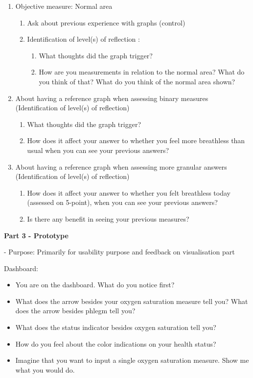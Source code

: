 \begin{enumerate}
\begin{enumerate}
\end{enumerate}
\item Objective measure: Normal area
\begin{enumerate}
	\item Ask about previous experience with graphs (control)
	\item Identification of level(s) of reflection :
	\begin{enumerate}
		\item What thoughts did the graph trigger?
		\item How are you measurements in relation to the normal area? What do you think of that? What do you think of the normal area shown?
	\end{enumerate}
\end{enumerate}
\item About having a reference graph when assessing binary measures (Identification of level(s) of reflection)
\begin{enumerate}
	\item What thoughts did the graph trigger?
	\item How does it affect your answer to whether you feel more breathless than usual when you can see your previous answers?
\end{enumerate}
\item About having a reference graph when assessing more granular answers (Identification of level(s) of reflection)
\begin{enumerate}
	\item How does it affect your answer to whether you felt breathless today (assessed on 5-point), when you can see your previous answers?
	\item Is there any benefit in seeing your previous measures?
\end{enumerate}
\end{enumerate}


\textbf{Part 3 - Prototype}

- Purpose: Primarily for usability purpose and feedback on visualisation part  

Dashboard:
\begin{itemize}
\item You are on the dashboard. What do you notice first?
\item What does the arrow besides your oxygen saturation measure tell you? What does the arrow besides phlegm tell you?
\item What does the status indicator besides oxygen saturation tell you?
\item How do you feel about the color indications on your health status?
\item Imagine that you want to input a single oxygen saturation measure. Show me what you would do. 
\end{itemize}

